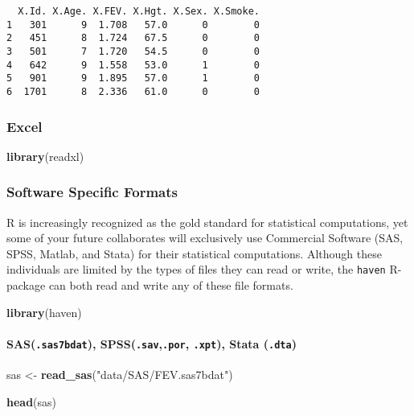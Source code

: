 \documentclass[12pt,]{article}
\newenvironment{Shaded}{\begin{snugshade}}{\end{snugshade}}
\newcommand{\KeywordTok}[1]{\textcolor[rgb]{0.13,0.29,0.53}{\textbf{#1}}}
\newcommand{\StringTok}[1]{\textcolor[rgb]{0.31,0.60,0.02}{#1}}
\newcommand{\NormalTok}[1]{#1}
\let\oldparagraph\paragraph
\renewcommand{\paragraph}[1]{\oldparagraph{#1}\mbox{}}
\theoremstyle{definition}
\theoremstyle{definition}
\theoremstyle{definition}
\theoremstyle{remark}
\begin{document}
\begin{verbatim}
  X.Id. X.Age. X.FEV. X.Hgt. X.Sex. X.Smoke.
1   301      9  1.708   57.0      0        0
2   451      8  1.724   67.5      0        0
3   501      7  1.720   54.5      0        0
4   642      9  1.558   53.0      1        0
5   901      9  1.895   57.0      1        0
6  1701      8  2.336   61.0      0        0
\end{verbatim}

\subsubsection{Excel}\label{excel}

\begin{Shaded}
\begin{Highlighting}[]
\KeywordTok{library}\NormalTok{(readxl)}
\end{Highlighting}
\end{Shaded}

\subsubsection{Software Specific
Formats}\label{software-specific-formats}

R is increasingly recognized as the gold standard for statistical
computations, yet some of your future collaborates will exclusively use
Commercial Software (SAS, SPSS, Matlab, and Stata) for their statistical
computations. Although these individuals are limited by the types of
files they can read or write, the \texttt{haven} R-package can both read
and write any of these file formats.

\begin{Shaded}
\begin{Highlighting}[]
\KeywordTok{library}\NormalTok{(haven)}
\end{Highlighting}
\end{Shaded}

\paragraph{\texorpdfstring{SAS(\texttt{.sas7bdat}),
SPSS(\texttt{.sav},\texttt{.por}, \texttt{.xpt}), Stata
(\texttt{.dta})}{SAS(.sas7bdat), SPSS(.sav,.por, .xpt), Stata (.dta)}}\label{sas.sas7bdat-spss.sav.por-.xpt-stata-.dta}

\begin{Shaded}
\begin{Highlighting}[]
\NormalTok{sas <-}\StringTok{ }\KeywordTok{read_sas}\NormalTok{(}\StringTok{"data/SAS/FEV.sas7bdat"}\NormalTok{)}

\KeywordTok{head}\NormalTok{(sas)}
\end{Highlighting}
\end{Shaded}
\end{document}
